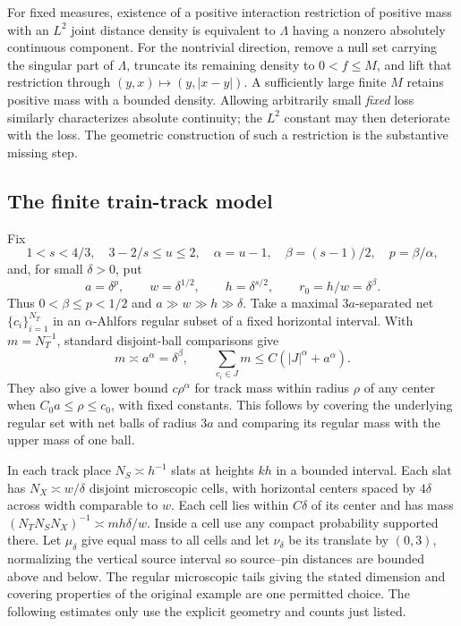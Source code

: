 For fixed measures, existence of a positive interaction restriction of
positive mass with an \(L^2\) joint distance density is equivalent to
\(\Lambda\) having a nonzero absolutely continuous component. For the
nontrivial direction, remove a null set carrying the singular part of
\(\Lambda\), truncate its remaining density to \(0<f\le M\), and
lift that restriction through \((y,x)\mapsto(y,|x-y|)\). A sufficiently
large finite \(M\) retains positive mass with a bounded density.
Allowing arbitrarily small \emph{fixed} loss similarly characterizes
absolute continuity; the \(L^2\) constant may then deteriorate with the
loss. The geometric construction of such a restriction is the substantive
missing step.

\subsection{The finite train-track model}
\label{selection:finite-model}
Fix
\[
 1<s<4/3,\quad 3-2/s\le u\le2,\quad
 \alpha=u-1,\quad\beta=(s-1)/2,\quad p=\beta/\alpha,
\]
and, for small \(\delta>0\), put
\[
 a=\delta^p,\qquad w=\delta^{1/2},\qquad h=\delta^{s/2},
 \qquad r_0=h/w=\delta^\beta.
\]
Thus \(0<\beta\le p<1/2\) and \(a\gg w\gg h\gg\delta\).
Take a maximal \(3a\)-separated net \(\{c_i\}_{i=1}^{N_T}\) in
an \(\alpha\)-Ahlfors regular subset of a fixed horizontal interval.
With \(m=N_T^{-1}\), standard disjoint-ball comparisons give
\begin{equation}\label{selection:center-count}
 m\asymp a^\alpha=\delta^\beta,\qquad
 \sum_{c_i\in J}m\le C(|J|^\alpha+a^\alpha).
\end{equation}
They also give a lower bound \(c\rho^\alpha\) for track mass within
radius \(\rho\) of any center when \(C_0a\le\rho\le c_0\), with
fixed constants. This follows by covering the underlying regular set with
net balls of radius \(3a\) and comparing its regular mass with the
upper mass of one ball.

In each track place \(N_S\asymp h^{-1}\) slats at heights \(kh\)
in a bounded interval. Each slat has \(N_X\asymp w/\delta\) disjoint
microscopic cells, with horizontal centers spaced by \(4\delta\) across
width comparable to \(w\). Each cell lies within \(C\delta\) of
its center and has mass \((N_TN_SN_X)^{-1}\asymp m h\delta/w\).
Inside a cell use any compact probability supported there. Let
\(\mu_\delta\) give equal mass to all cells and let \(\nu_\delta\)
be its translate by \((0,3)\), normalizing the vertical source interval
so source--pin distances are bounded above and below.
The regular microscopic tails giving the stated dimension and covering
properties of the original example are one permitted choice. The following
estimates only use the explicit geometry and counts just listed.

